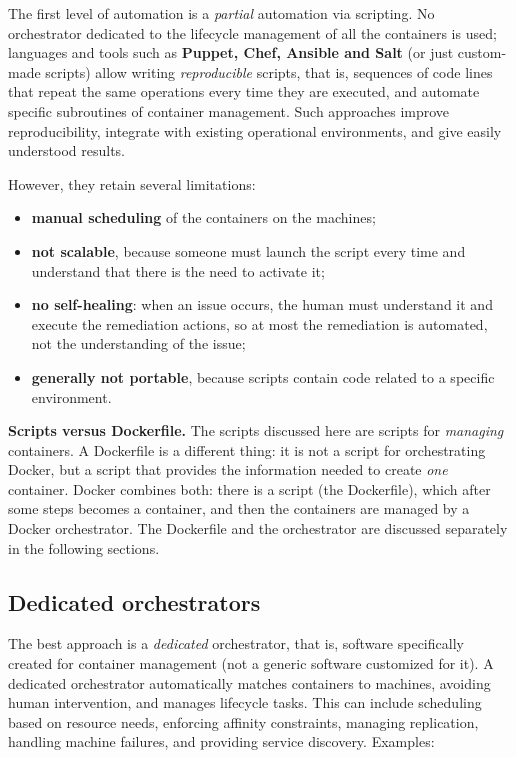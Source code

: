 The first level of automation is a \emph{partial} automation via scripting. No orchestrator dedicated to the lifecycle management of all the containers is used; languages and tools such as \textbf{Puppet, Chef, Ansible and Salt} (or just custom-made scripts) allow writing \emph{reproducible} scripts, that is, sequences of code lines that repeat the same operations every time they are executed, and automate specific subroutines of container management. Such approaches improve reproducibility, integrate with existing operational environments, and give easily understood results.

However, they retain several limitations:

\begin{itemize}
\item \textbf{manual scheduling} of the containers on the machines;
\item \textbf{not scalable}, because someone must launch the script every time and understand that there is the need to activate it;
\item \textbf{no self-healing}: when an issue occurs, the human must understand it and execute the remediation actions, so at most the remediation is automated, not the understanding of the issue;
\item \textbf{generally not portable}, because scripts contain code related to a specific environment.
\end{itemize}

\begin{notebox}
	\textbf{Scripts versus Dockerfile.} The scripts discussed here are scripts for \emph{managing} containers. A Dockerfile is a different thing: it is not a script for orchestrating Docker, but a script that provides the information needed to create \emph{one} container. Docker combines both: there is a script (the Dockerfile), which after some steps becomes a container, and then the containers are managed by a Docker orchestrator. The Dockerfile and the orchestrator are discussed separately in the following sections.
\end{notebox}

\subsection{Dedicated orchestrators}

The best approach is a \emph{dedicated} orchestrator, that is, software specifically created for container management (not a generic software customized for it). A dedicated orchestrator automatically matches containers to machines, avoiding human intervention, and manages lifecycle tasks. This can include scheduling based on resource needs, enforcing affinity constraints, managing replication, handling machine failures, and providing service discovery. Examples:


